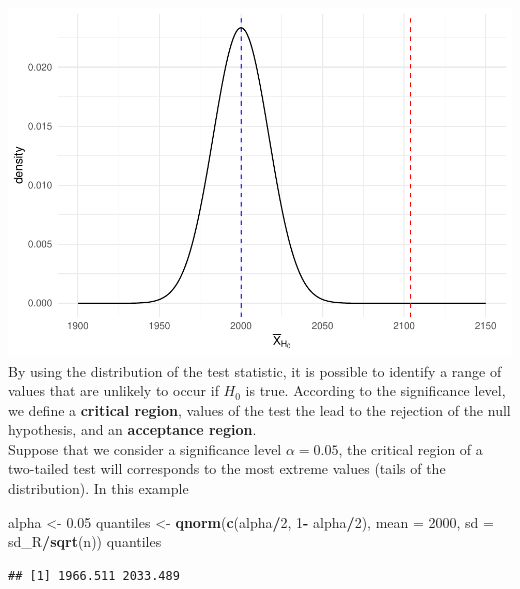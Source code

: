 \documentclass[
]{article}
\newenvironment{Shaded}{\begin{snugshade}}{\end{snugshade}}
\newcommand{\AttributeTok}[1]{\textcolor[rgb]{0.13,0.29,0.53}{#1}}
\newcommand{\DecValTok}[1]{\textcolor[rgb]{0.00,0.00,0.81}{#1}}
\newcommand{\FloatTok}[1]{\textcolor[rgb]{0.00,0.00,0.81}{#1}}
\newcommand{\FunctionTok}[1]{\textcolor[rgb]{0.13,0.29,0.53}{\textbf{#1}}}
\newcommand{\NormalTok}[1]{#1}
\newcommand{\OtherTok}[1]{\textcolor[rgb]{0.56,0.35,0.01}{#1}}
\newcommand{\SpecialCharTok}[1]{\textcolor[rgb]{0.81,0.36,0.00}{\textbf{#1}}}
\begin{document}
\includegraphics{Hypothesis_Testing_files/figure-latex/unnamed-chunk-5-1.pdf}
By using the distribution of the test statistic, it is possible to
identify a range of values that are unlikely to occur if \(H_0\) is
true. According to the significance level, we define a \textbf{critical
region}, values of the test the lead to the rejection of the null
hypothesis, and an \textbf{acceptance region}.\\
Suppose that we consider a significance level \(\alpha = 0.05\), the
critical region of a two-tailed test will corresponds to the most
extreme values (tails of the distribution). In this example

\begin{Shaded}
\begin{Highlighting}[]
\NormalTok{alpha }\OtherTok{\textless{}{-}} \FloatTok{0.05}
\NormalTok{quantiles }\OtherTok{\textless{}{-}} \FunctionTok{qnorm}\NormalTok{(}\FunctionTok{c}\NormalTok{(alpha}\SpecialCharTok{/}\DecValTok{2}\NormalTok{, }\DecValTok{1}\SpecialCharTok{{-}}\NormalTok{ alpha}\SpecialCharTok{/}\DecValTok{2}\NormalTok{), }
      \AttributeTok{mean =} \DecValTok{2000}\NormalTok{, }
      \AttributeTok{sd =}\NormalTok{ sd\_R}\SpecialCharTok{/}\FunctionTok{sqrt}\NormalTok{(n))}
\NormalTok{quantiles}
\end{Highlighting}
\end{Shaded}

\begin{verbatim}
## [1] 1966.511 2033.489
\end{verbatim}
\end{document}
